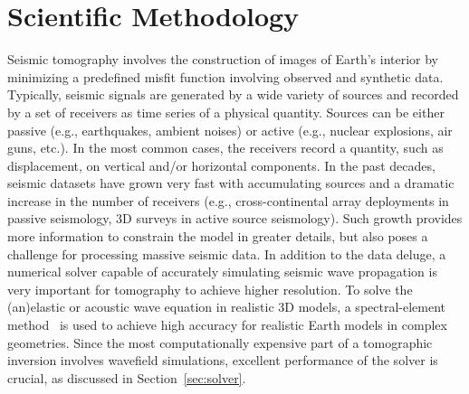 \section{Scientific Methodology}
\label{sec:scientific_method}

Seismic tomography involves the construction of images of Earth's interior by
minimizing a predefined misfit function involving observed and synthetic data. Typically, 
seismic signals are generated by a wide variety of sources and recorded by a
set of receivers as time series of a physical quantity. Sources can be either 
passive (e.g., earthquakes, ambient noises) or active (e.g., nuclear explosions, 
air guns, etc.). In the most common cases, the receivers record a quantity, such as displacement, 
on vertical and/or horizontal components. In the past decades, 
seismic datasets have grown very fast with accumulating sources and a
dramatic increase in the number of receivers (e.g., cross-continental array
deployments in passive seismology, 3D surveys in active source seismology). Such
growth provides more information to constrain the model in greater details, but
also poses a challenge for processing massive seismic data. In addition to
the data deluge, a numerical solver capable of accurately simulating seismic wave
propagation is very important for tomography to achieve higher resolution. 
To solve the (an)elastic or acoustic wave equation in realistic 3D models, a spectral-element
method~\cite{KoTr99, KoTr02a, KoTr02b} is used to achieve
high accuracy for realistic Earth models in complex geometries.
Since the most computationally expensive part of a tomographic inversion
involves wavefield simulations, excellent performance of the solver is crucial,
as discussed in Section~\ref{sec:solver}.

